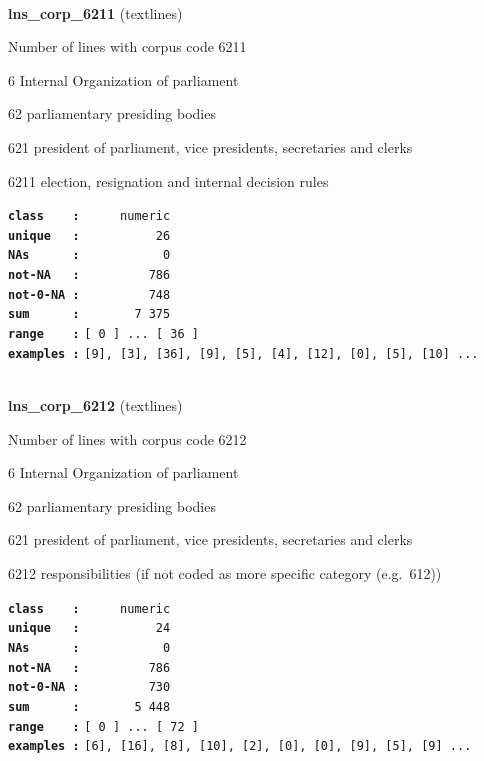 \documentclass[]{article}
\begin{document}
~

\textbf{lns\_corp\_6211} (textlines)

Number of lines with corpus code 6211

6 Internal Organization of parliament

62 parliamentary presiding bodies

621 president of parliament, vice presidents, secretaries and clerks

6211 election, resignation and internal decision rules

\textbf{\texttt{class\ \ \ \ :}} \texttt{~~~~~numeric}\\
\textbf{\texttt{unique\ \ \ :}} \texttt{~~~~~~~~~~26}\\
\textbf{\texttt{NAs\ \ \ \ \ \ :}} \texttt{~~~~~~~~~~~0}\\
\textbf{\texttt{not-NA\ \ \ :}} \texttt{~~~~~~~~~786}\\
\textbf{\texttt{not-0-NA\ :}} \texttt{~~~~~~~~~748}\\
\textbf{\texttt{sum\ \ \ \ \ \ :}} \texttt{~~~~~~~7~375}\\
\textbf{\texttt{range\ \ \ \ :}}
\texttt{{[}\ 0\ {]}\ ...\ {[}\ 36\ {]}}\\
\textbf{\texttt{examples\ :}}
\texttt{{[}9{]},\ {[}3{]},\ {[}36{]},\ {[}9{]},\ {[}5{]},\ {[}4{]},\ {[}12{]},\ {[}0{]},\ {[}5{]},\ {[}10{]}\ ...}\\

~

\textbf{lns\_corp\_6212} (textlines)

Number of lines with corpus code 6212

6 Internal Organization of parliament

62 parliamentary presiding bodies

621 president of parliament, vice presidents, secretaries and clerks

6212 responsibilities (if not coded as more specific category
(e.g.~612))

\textbf{\texttt{class\ \ \ \ :}} \texttt{~~~~~numeric}\\
\textbf{\texttt{unique\ \ \ :}} \texttt{~~~~~~~~~~24}\\
\textbf{\texttt{NAs\ \ \ \ \ \ :}} \texttt{~~~~~~~~~~~0}\\
\textbf{\texttt{not-NA\ \ \ :}} \texttt{~~~~~~~~~786}\\
\textbf{\texttt{not-0-NA\ :}} \texttt{~~~~~~~~~730}\\
\textbf{\texttt{sum\ \ \ \ \ \ :}} \texttt{~~~~~~~5~448}\\
\textbf{\texttt{range\ \ \ \ :}}
\texttt{{[}\ 0\ {]}\ ...\ {[}\ 72\ {]}}\\
\textbf{\texttt{examples\ :}}
\texttt{{[}6{]},\ {[}16{]},\ {[}8{]},\ {[}10{]},\ {[}2{]},\ {[}0{]},\ {[}0{]},\ {[}9{]},\ {[}5{]},\ {[}9{]}\ ...}\\
\end{document}
